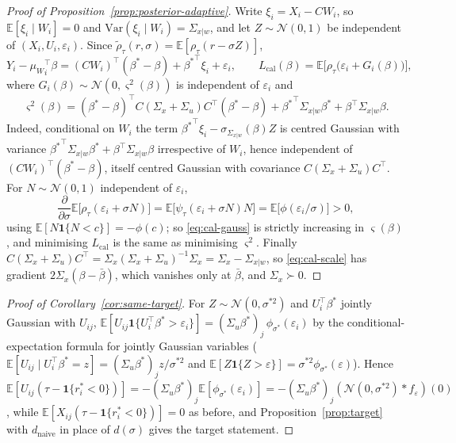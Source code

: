 \documentclass[12pt,a4paper]{article}
\theoremstyle{definition}
\theoremstyle{remark}
\newcommand{\E}{\mathbb{E}}
\newcommand{\cN}{\mathcal{N}}
\newcommand{\ind}[1]{\mathbf{1}\{#1\}}
\newcommand{\rht}{\tilde{\rho}_\tau}
\newcommand{\psit}{\psi_\tau}
\newcommand{\betas}{\beta^*}
\newcommand{\bbar}{\bar{\beta}}
\newcommand{\muv}{\mu_W}
\newcommand{\Sxw}{\Sigma_{x|w}}
\newcommand{\Ccal}{C}
\begin{document}
\begin{proof}[Proof of Proposition~\ref{prop:posterior-adaptive}]
Write $\xi_i=X_i-\Ccal W_i$, so $\E[\xi_i\mid W_i]=0$ and
$\mathrm{Var}(\xi_i\mid W_i)=\Sxw$, and let $Z\sim\cN(0,1)$ be
independent of $(X_i,U_i,\varepsilon_i)$. Since $\rht(r,\sigma)=\E[\rho_\tau(r-\sigma Z)]$,
\begin{equation}
Y_i-{\muv}_i^\top\beta
=(\Ccal W_i)^\top(\betas-\beta)+{\betas}^\top\xi_i+\varepsilon_i,
\qquad
L_{\mathrm{cal}}(\beta)=\E\big[\rho_\tau\big(\varepsilon_i+G_i(\beta)\big)\big],
\label{eq:cal-gauss}
\end{equation}
where $G_i(\beta)\sim\cN(0,\varsigma^2(\beta))$ is independent of $\varepsilon_i$ and
\begin{equation}
\varsigma^2(\beta)=(\betas-\beta)^\top\Ccal(\Sigma_x+\Sigma_u)\Ccal^\top(\betas-\beta)
+{\betas}^\top\Sxw\betas+\beta^\top\Sxw\beta .
\label{eq:cal-scale}
\end{equation}
Indeed, conditional on $W_i$ the term ${\betas}^\top\xi_i-\sigma_{\Sxw}(\beta)Z$ is centred
Gaussian with variance ${\betas}^\top\Sxw\betas+\beta^\top\Sxw\beta$ irrespective of $W_i$,
hence independent of $(\Ccal W_i)^\top(\betas-\beta)$, itself centred Gaussian with
covariance $\Ccal(\Sigma_x+\Sigma_u)\Ccal^\top$. For $N\sim\cN(0,1)$ independent of
$\varepsilon_i$,
\[
\frac{\partial}{\partial\sigma}\E\big[\rho_\tau(\varepsilon_i+\sigma N)\big]
=\E\big[\psit(\varepsilon_i+\sigma N)N\big]
=\E\big[\phi(\varepsilon_i/\sigma)\big]>0,
\]
using $\E[N\ind{N<c}]=-\phi(c)$; so \eqref{eq:cal-gauss} is
strictly increasing in $\varsigma(\beta)$, and minimising $L_{\mathrm{cal}}$ is the same as
minimising $\varsigma^2$. Finally
$\Ccal(\Sigma_x+\Sigma_u)\Ccal^\top=\Sigma_x(\Sigma_x+\Sigma_u)^{-1}\Sigma_x
=\Sigma_x-\Sxw$, so \eqref{eq:cal-scale} has gradient $2\Sigma_x(\beta-\bbar)$, which
vanishes only at $\bbar$, and $\Sigma_x\succ0$.
\end{proof}

\begin{proof}[Proof of Corollary~\ref{cor:same-target}]
For $Z\sim\cN(0,\sigma^{*2})$ and $U_i^\top\betas$ jointly Gaussian with
$U_{ij}$, $\E[U_{ij}\ind{U_i^\top\betas>\varepsilon_i}]
= (\Sigma_u\betas)_j\,\phi_{\sigma^*}(\varepsilon_i)$
by the conditional-expectation formula for jointly Gaussian variables
($\E[U_{ij}\mid U_i^\top\betas=z] = (\Sigma_u\betas)_j z/\sigma^{*2}$ and
$\E[Z\ind{Z>\varepsilon}] = \sigma^{*2}\phi_{\sigma^*}(\varepsilon)$). Hence
$\E[U_{ij}(\tau-\ind{r_i^*<0})] = -(\Sigma_u\betas)_j\E[\phi_{\sigma^*}(\varepsilon_i)]
= -(\Sigma_u\betas)_j(\cN(0,\sigma^{*2})*f_\varepsilon)(0)$,
while $\E[X_{ij}(\tau-\ind{r_i^*<0})]=0$ as before, and
Proposition~\ref{prop:target} with $d_{\mathrm{naive}}$ in place of $d(\sigma)$ gives the
target statement.
\end{proof}
\end{document}
